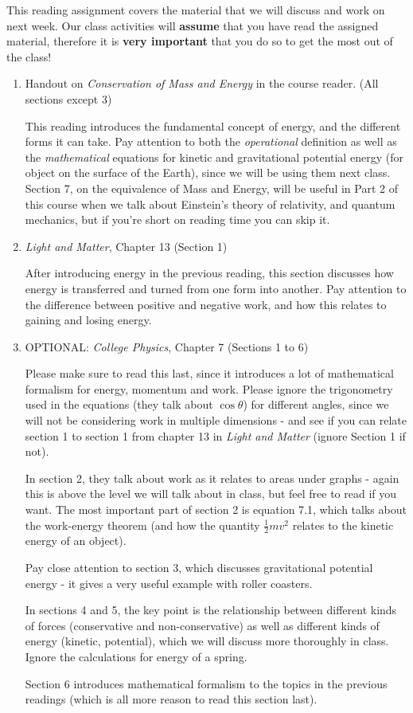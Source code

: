 \documentclass[addpoints,12pt]{exam}
\begin{document}
This reading assignment covers the material that we will discuss and work on next week. Our class activities will \textbf{assume} that you have read the assigned material, therefore it is \textbf{very important} that you do so to get the most out of the class!
\begin{enumerate}

	\item Handout on \textit{Conservation of Mass and Energy} in the course reader. (All sections except 3)
	
	This reading introduces the fundamental concept of energy, and the different forms it can take. Pay attention to both the \textit{operational} definition as well as the \textit{mathematical} equations for kinetic and gravitational potential energy (for object on the surface of the Earth), since we will be using them next class. Section 7, on the equivalence of Mass and Energy, will be useful in Part 2 of this course when we talk about Einstein's theory of relativity, and quantum mechanics, but if you're short on reading time you can skip it.
	
	\item \textit{Light and Matter}, Chapter 13 (Section 1)
	
	After introducing energy in the previous reading, this section discusses how energy is transferred and turned from one form into another. Pay attention to the difference between positive and negative work, and how this relates to gaining and losing energy.
	
	\item OPTIONAL: \textit{College Physics}, Chapter 7 (Sections 1 to 6)
	
	Please make sure to read this last, since it introduces a lot of mathematical formalism for energy, momentum and work. Please ignore the trigonometry used in the equations (they talk about $\cos\theta$) for different angles, since we will not be considering work in multiple dimensions - and see if you can relate section 1 to section 1 from chapter 13 in \textit{Light and Matter} (ignore Section 1 if not). 
	
	In section 2, they talk about work as it relates to areas under graphs - again this is above the level we will talk about in class, but feel free to read if you want. The most important part of section 2 is equation 7.1, which talks about the work-energy theorem (and how the quantity $\frac{1}{2}mv^2$ relates to the kinetic energy of an object). 
	
	Pay close attention to section 3, which discusses gravitational potential energy - it gives a very useful example with roller coasters.
	
	In sections 4 and 5, the key point is the relationship between different kinds of forces (conservative and non-conservative) as well as different kinds of energy (kinetic, potential), which we will discuss more thoroughly in class. Ignore the calculations for energy of a spring.
	
	Section 6 introduces mathematical formalism to the topics in the previous readings (which is all more reason to read this section last).
	
	
	
\end{enumerate}
\end{document}
